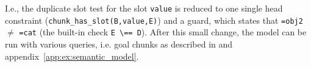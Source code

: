 I.e., the duplicate slot test for the slot \lstinline|value| is reduced to one single head constraint (\lstinline|chunk_has_slot(B,value,E)|) and a guard, which states that \lstinline|=obj2| $\neq$ \lstinline|=cat| (the built-in check \lstinline|E \== D|). After this small change, the model can be run with various queries, i.e. goal chunks as described in \cite[unit 1, pp. 24\psqq]{actr_tutorial} and appendix~\ref{app:ex:semantic_model}.


